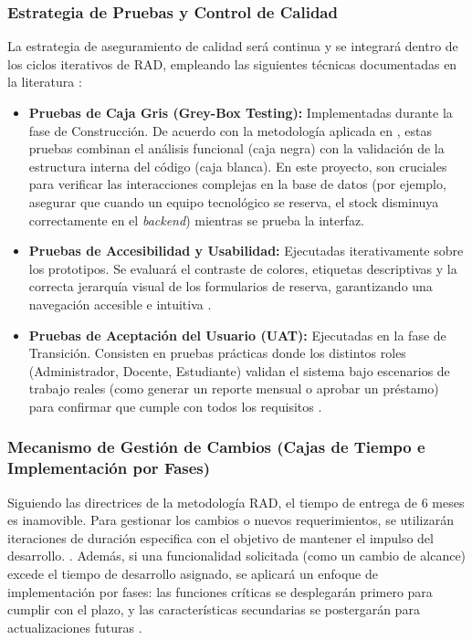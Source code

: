 \documentclass[pdflatex,sn-mathphys-num]{sn-jnl}%
\theoremstyle{thmstyleone}%
\theoremstyle{thmstyletwo}%
\theoremstyle{thmstylethree}%
\begin{document}
 \subsubsection{Estrategia de Pruebas y Control de Calidad}
La estrategia de aseguramiento de calidad será continua y se integrará dentro de los ciclos iterativos de RAD, empleando las siguientes técnicas documentadas en la literatura \cite{purnamasari_rapid_2026, alvarez-pineda_implementacion_2026}:

\begin{itemize}
	\item \textbf{Pruebas de Caja Gris (Grey-Box Testing):} Implementadas durante la fase de Construcción. De acuerdo con la metodología aplicada en \cite[p.~338]{purnamasari_rapid_2026}, estas pruebas combinan el análisis funcional (caja negra) con la validación de la estructura interna del código (caja blanca). En este proyecto, son cruciales para verificar las interacciones complejas en la base de datos (por ejemplo, asegurar que cuando un equipo tecnológico se reserva, el stock disminuya correctamente en el \textit{backend}) mientras se prueba la interfaz.
	
	\item \textbf{Pruebas de Accesibilidad y Usabilidad:} Ejecutadas iterativamente sobre los prototipos. Se evaluará el contraste de colores, etiquetas descriptivas y la correcta jerarquía visual de los formularios de reserva, garantizando una navegación accesible e intuitiva \cite{alvarez-pineda_implementacion_2026}.
	
	\item \textbf{Pruebas de Aceptación del Usuario (UAT):} Ejecutadas en la fase de Transición. Consisten en pruebas prácticas donde los distintos roles (Administrador, Docente, Estudiante) validan el sistema bajo escenarios de trabajo reales (como generar un reporte mensual o aprobar un préstamo) para confirmar que cumple con todos los requisitos \cite{purnamasari_rapid_2026}.
\end{itemize}
\subsubsection{Mecanismo de Gestión de Cambios (Cajas de Tiempo e Implementación por Fases)}
Siguiendo las directrices de la metodología RAD, el tiempo de entrega de 6 meses es inamovible. Para gestionar los cambios o nuevos requerimientos, se utilizarán iteraciones de duración especifica con el objetivo de mantener el impulso del desarrollo. \cite[p.~340]{purnamasari_rapid_2026}. Además, si una funcionalidad solicitada (como un cambio de alcance) excede el tiempo de desarrollo asignado, se aplicará un enfoque de implementación por fases: las funciones críticas se desplegarán primero para cumplir con el plazo, y las características secundarias se postergarán para actualizaciones futuras \cite[p.~340]{purnamasari_rapid_2026}.
\end{document}
